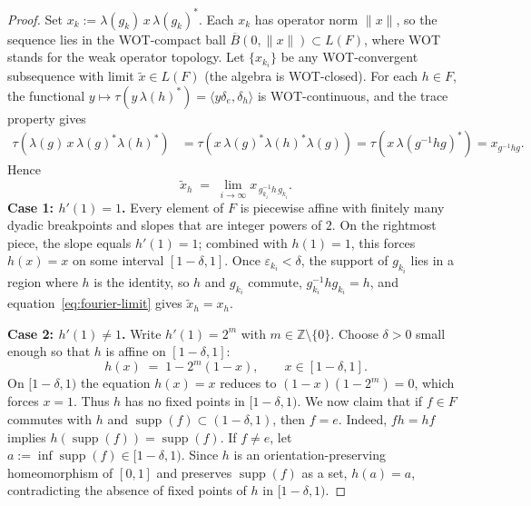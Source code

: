 \documentclass[11pt]{amsart}
\theoremstyle{definition}
\newcommand{\supp}{\operatorname{supp}}
\begin{document}
\begin{proof}
Set $x_k := \lambda(g_k)\, x\, \lambda(g_k)^*$. Each $x_k$ has operator norm $\|x\|$, so the sequence lies in the WOT-compact ball $\overline{B}(0, \|x\|) \subset L(F)$, where WOT stands for the weak operator topology.  Let $\{x_{k_i}\}$ be any WOT-convergent subsequence with limit $\tilde{x} \in L(F)$ (the algebra is WOT-closed). For each $h \in F$, the functional $y \mapsto \tau(y\,\lambda(h)^*) = \langle y\delta_e, \delta_h\rangle$ is WOT-continuous, and the trace property gives
\begin{align*}
\tau\!\left(\lambda(g)\, x\, \lambda(g)^* \lambda(h)^*\right) &= \tau\!\left(x\, \lambda(g)^* \lambda(h)^* \lambda(g)\right) = \tau\!\left(x\, \lambda(g^{-1} h g)^*\right) =x_{g^{-1} h g}.
\end{align*}
Hence
\begin{equation}\label{eq:fourier-limit}
\tilde{x}_h \;=\; \lim_{i \to \infty} x_{\, g_{k_i}^{-1} h\, g_{k_i}}.
\end{equation}
\medskip
\noindent\textbf{Case 1: $h'(1) = 1$.} Every element of $F$ is piecewise affine with finitely many dyadic breakpoints and slopes that are integer powers of $2$. On the rightmost piece, the slope equals $h'(1) = 1$; combined with $h(1) = 1$, this forces $h(x) = x$ on some interval $[1 - \delta, 1]$. Once $\varepsilon_{k_i} < \delta$, the support of $g_{k_i}$ lies in a region where $h$ is the identity, so $h$ and $g_{k_i}$ commute, $g_{k_i}^{-1} h g_{k_i} = h$, and equation~\eqref{eq:fourier-limit} gives $\tilde{x}_h = x_h$.

\medskip
\noindent\textbf{Case 2: $h'(1) \neq 1$.} Write $h'(1) = 2^m$ with $m \in \mathbb{Z} \setminus \{0\}$. Choose $\delta > 0$ small enough so that $h$ is affine on $[1 - \delta, 1]$:
\[
h(x) \;=\; 1 - 2^m(1 - x), \qquad x \in [1 - \delta, 1].
\]
On $[1 - \delta, 1)$ the equation $h(x) = x$ reduces to $(1 - x)(1 - 2^m) = 0$, which forces $x = 1$. Thus $h$ has no fixed points in $[1 - \delta, 1)$.
We now claim that if $f \in F$ commutes with $h$ and $\supp(f) \subset (1 - \delta, 1)$, then $f = e$.
Indeed, $fh = hf$ implies $h(\supp(f)) = \supp(f)$. If $f \neq e$, let $a := \inf \supp(f) \in [1 - \delta, 1)$. Since $h$ is an orientation-preserving homeomorphism of $[0,1]$ and preserves $\supp(f)$ as a set, $h(a) = a$, contradicting the absence of fixed points of $h$ in $[1 - \delta, 1)$.


\end{proof}
\end{document}
